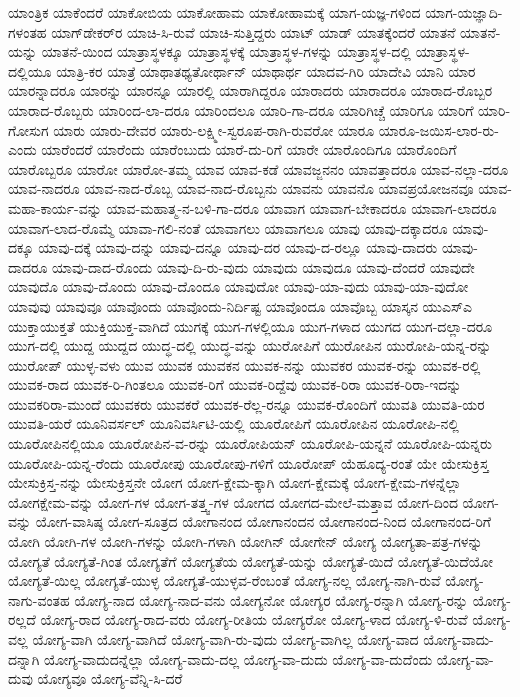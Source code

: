{ಯಾಂತ್ರಿಕ
ಯಾಕೆಂದರೆ
ಯಾಕೋಬಿಯ
ಯಾಕೋಹಾಮ
ಯಾಕೋಹಾಮಕ್ಕೆ
ಯಾಗ-ಯಜ್ಞ-ಗಳಿಂದ
ಯಾಗ-ಯಜ್ಞಾದಿ-ಗಳಂತಹ
ಯಾಗ್‌ಡೇಕರ್‌ರ
ಯಾಚಿ-ಸಿ-ರುವೆ
ಯಾಚಿ-ಸುತ್ತಿದ್ದರು
ಯಾಟ್
ಯಾಡ್
ಯಾತಕ್ಕೆಂದರೆ
ಯಾತನೆ
ಯಾತನೆ-ಯನ್ನು
ಯಾತನೆ-ಯಿಂದ
ಯಾತ್ರಾಸ್ಥಳಕ್ಕೂ
ಯಾತ್ರಾಸ್ಥಳಕ್ಕೆ
ಯಾತ್ರಾಸ್ಥಳ-ಗಳನ್ನು
ಯಾತ್ರಾಸ್ಥಳ-ದಲ್ಲಿ
ಯಾತ್ರಾಸ್ಥಳ-ದಲ್ಲಿಯೂ
ಯಾತ್ರಿ-ಕರ
ಯಾತ್ರೆ
ಯಾಥಾತಥ್ಯತೋರ್ಥಾನ್
ಯಾಥಾರ್ಥ
ಯಾದವ-ಗಿರಿ
ಯಾದೇವಿ
ಯಾನಿ
ಯಾರ
ಯಾರನ್ನಾದರೂ
ಯಾರನ್ನು
ಯಾರನ್ನೂ
ಯಾರಲ್ಲಿ
ಯಾರಾಗಿದ್ದರೂ
ಯಾರಾದರು
ಯಾರಾದರೂ
ಯಾರಾದ-ರೊಬ್ಬರ
ಯಾರಾದ-ರೊಬ್ಬರು
ಯಾರಿಂದ-ಲಾ-ದರೂ
ಯಾರಿಂದಲೂ
ಯಾರಿ-ಗಾ-ದರೂ
ಯಾರಿಗಿಚ್ಚೆ
ಯಾರಿಗೂ
ಯಾರಿಗೆ
ಯಾರಿ-ಗೋಸುಗ
ಯಾರು
ಯಾರು-ದೇವರ
ಯಾರು-ಲಕ್ಷ್ಮೀ-ಸ್ವರೂಪ-ರಾಗಿ-ರುವರೋ
ಯಾರೂ
ಯಾರೂ-ಜಯಿಸ-ಲಾರ-ರು-ಎಂದು
ಯಾರೆಂದರೆ
ಯಾರೆಂದು
ಯಾರೆಂಬುದು
ಯಾರೆ-ದು-ರಿಗೆ
ಯಾರೇ
ಯಾರೊಂದಿಗೂ
ಯಾರೊಂದಿಗೆ
ಯಾರೊಬ್ಬರೂ
ಯಾರೋ
ಯಾರೋ-ತಮ್ಮ
ಯಾವ
ಯಾವ-ಕಡೆ
ಯಾವಜ್ಜನನಂ
ಯಾವತ್ತಾದರೂ
ಯಾವ-ನಲ್ಲಾ-ದರೂ
ಯಾವ-ನಾದರೂ
ಯಾವ-ನಾದ-ರೊಬ್ಬ
ಯಾವ-ನಾದ-ರೊಬ್ಬನು
ಯಾವನು
ಯಾವನೊ
ಯಾವಪ್ರಯೋಜನವೂ
ಯಾವ-ಮಹಾ-ಕಾರ್ಯ-ವನ್ನು
ಯಾವ-ಮಹಾತ್ಮ-ನ-ಬಳಿ-ಗಾ-ದರೂ
ಯಾವಾಗ
ಯಾವಾಗ-ಬೇಕಾದರೂ
ಯಾವಾಗ-ಲಾದರೂ
ಯಾವಾಗ-ಲಾದ-ರೊಮ್ಮೆ
ಯಾವಾ-ಗಲಿ-ನಂತೆ
ಯಾವಾಗಲು
ಯಾವಾಗಲೂ
ಯಾವು
ಯಾವು-ದಕ್ಕಾದರೂ
ಯಾವು-ದಕ್ಕೂ
ಯಾವು-ದಕ್ಕೆ
ಯಾವು-ದನ್ನು
ಯಾವು-ದನ್ನೂ
ಯಾವು-ದರ
ಯಾವು-ದ-ರಲ್ಲೂ
ಯಾವು-ದಾದರು
ಯಾವು-ದಾದರೂ
ಯಾವು-ದಾದ-ರೊಂದು
ಯಾವು-ದಿ-ರು-ವುದು
ಯಾವುದು
ಯಾವುದೂ
ಯಾವು-ದೆಂದರೆ
ಯಾವುದೇ
ಯಾವುದೊ
ಯಾವು-ದೊಂದು
ಯಾವು-ದೊಂದೂ
ಯಾವುದೋ
ಯಾವು-ಯಾ-ವುದು
ಯಾವು-ಯಾ-ವುದೋ
ಯಾವುವು
ಯಾವುವೂ
ಯಾವೊಂದು
ಯಾವೊಂದು-ನಿರ್ದಿಷ್ಟ
ಯಾವೊಂದೂ
ಯಾವೊಬ್ಬ
ಯಾಸ್ಕನ
ಯುಎಸ್ಎ
ಯುಕ್ತಾಯುಕ್ತತೆ
ಯುಕ್ತಿಯುಕ್ತ-ವಾಗಿದೆ
ಯುಗಕ್ಕೆ
ಯುಗ-ಗಳಲ್ಲಿಯೂ
ಯುಗ-ಗಳಾದ
ಯುಗದ
ಯುಗ-ದಲ್ಲಾ-ದರೂ
ಯುಗ-ದಲ್ಲಿ
ಯುದ್ದ
ಯುದ್ದದ
ಯುದ್ಧ-ದಲ್ಲಿ
ಯುದ್ಧ-ವನ್ನು
ಯುರೋಪಿಗೆ
ಯುರೋಪಿನ
ಯುರೋಪಿ-ಯನ್ನ-ರನ್ನು
ಯುರೋಪ್
ಯುಳ್ಳ-ವಳು
ಯುವ
ಯುವಕ
ಯುವಕನ
ಯುವಕ-ನನ್ನು
ಯುವಕರ
ಯುವಕ-ರನ್ನು
ಯುವಕ-ರಲ್ಲಿ
ಯುವಕ-ರಾದ
ಯುವಕ-ರಿ-ಗಿಂತಲೂ
ಯುವಕ-ರಿಗೆ
ಯುವಕ-ರಿದ್ದೆವು
ಯುವಕ-ರಿರಾ
ಯುವಕ-ರಿರಾ-ಇದನ್ನು
ಯುವಕರಿರಾ-ಮುಂದೆ
ಯುವಕರು
ಯುವಕರೆ
ಯುವಕ-ರೆಲ್ಲ-ರನ್ನೂ
ಯುವಕ-ರೊಂದಿಗೆ
ಯುವತಿ
ಯುವತಿ-ಯರ
ಯುವತಿ-ಯರೆ
ಯೂನಿವರ್ಸಲ್
ಯೂನಿವರ್ಸಿಟಿ-ಯಲ್ಲಿ
ಯೂರೋಪಿಗೆ
ಯೂರೋಪಿನ
ಯೂರೋಪಿ-ನಲ್ಲಿ
ಯೂರೋಪಿನಲ್ಲಿಯೂ
ಯೂರೋಪಿನ-ವ-ರನ್ನು
ಯೂರೋಪಿಯನ್
ಯೂರೋಪಿ-ಯನ್ನನೆ
ಯೂರೋಪಿ-ಯನ್ನರು
ಯೂರೋಪಿ-ಯನ್ನ-ರೆಂದು
ಯೂರೋಪು
ಯೂರೋಪು-ಗಳಿಗೆ
ಯೂರೋಪ್
ಯೆಹೂದ್ಯ-ರಂತೆ
ಯೇ
ಯೇಸುಕ್ರಿಸ್ತ
ಯೇಸುಕ್ರಿಸ್ತ-ನನ್ನು
ಯೇಸುಕ್ರಿಸ್ತನೇ
ಯೋಗ
ಯೋಗ-ಕ್ಷೇಮ-ಕ್ಕಾಗಿ
ಯೋಗ-ಕ್ಷೇಮಕ್ಕೆ
ಯೋಗ-ಕ್ಷೇಮ-ಗಳನ್ನೆಲ್ಲಾ
ಯೋಗಕ್ಷೇಮ-ವನ್ನು
ಯೋಗ-ಗಳ
ಯೋಗ-ತತ್ತ್ವ-ಗಳ
ಯೋಗದ
ಯೋಗದ-ಮೇಲೆ-ಮತ್ತಾವ
ಯೋಗ-ದಿಂದ
ಯೋಗ-ವನ್ನು
ಯೋಗ-ವಾಸಿಷ್ಠ
ಯೋಗ-ಸೂತ್ರದ
ಯೋಗಾನಂದ
ಯೋಗಾನಂದನ
ಯೋಗಾನಂದ-ನಿಂದ
ಯೋಗಾನಂದ-ರಿಗೆ
ಯೋಗಿ
ಯೋಗಿ-ಗಳ
ಯೋಗಿ-ಗಳನ್ನು
ಯೋಗಿ-ಗಳಾಗಿ
ಯೋಗಿನ್
ಯೋಗೇನ್
ಯೋಗ್ಯ
ಯೋಗ್ಯತಾ-ಪತ್ರ-ಗಳನ್ನು
ಯೋಗ್ಯತೆ
ಯೋಗ್ಯತೆ-ಗಿಂತ
ಯೋಗ್ಯತೆಗೆ
ಯೋಗ್ಯತೆಯ
ಯೋಗ್ಯತೆ-ಯನ್ನು
ಯೋಗ್ಯತೆ-ಯಿದೆ
ಯೋಗ್ಯತೆ-ಯಿದೆಯೋ
ಯೋಗ್ಯತೆ-ಯಿಲ್ಲ
ಯೋಗ್ಯತೆ-ಯುಳ್ಳ
ಯೋಗ್ಯತೆ-ಯುಳ್ಳವ-ರೆಂಬಂತೆ
ಯೋಗ್ಯ-ನಲ್ಲ
ಯೋಗ್ಯ-ನಾಗಿ-ರುವೆ
ಯೋಗ್ಯ-ನಾಗು-ವಂತಹ
ಯೋಗ್ಯ-ನಾದ
ಯೋಗ್ಯ-ನಾದ-ವನು
ಯೋಗ್ಯನೋ
ಯೋಗ್ಯರ
ಯೋಗ್ಯ-ರನ್ನಾಗಿ
ಯೋಗ್ಯ-ರನ್ನು
ಯೋಗ್ಯ-ರಲ್ಲದೆ
ಯೋಗ್ಯ-ರಾದ
ಯೋಗ್ಯ-ರಾದ-ವರು
ಯೋಗ್ಯ-ರೀತಿಯ
ಯೋಗ್ಯರೋ
ಯೋಗ್ಯ-ಳಾದ
ಯೋಗ್ಯ-ಳಿ-ರುವೆ
ಯೋಗ್ಯ-ವಲ್ಲ
ಯೋಗ್ಯ-ವಾಗಿ
ಯೋಗ್ಯ-ವಾಗಿದೆ
ಯೋಗ್ಯ-ವಾಗಿ-ರು-ವುದು
ಯೋಗ್ಯ-ವಾಗಿಲ್ಲ
ಯೋಗ್ಯ-ವಾದ
ಯೋಗ್ಯ-ವಾದು-ದನ್ನಾಗಿ
ಯೋಗ್ಯ-ವಾದುದನ್ನೆಲ್ಲಾ
ಯೋಗ್ಯ-ವಾದು-ದಲ್ಲ
ಯೋಗ್ಯ-ವಾ-ದುದು
ಯೋಗ್ಯ-ವಾ-ದುದೆಂದು
ಯೋಗ್ಯ-ವಾ-ದುವು
ಯೋಗ್ಯವೂ
ಯೋಗ್ಯ-ವೆನ್ನಿ-ಸಿ-ದರೆ
}
